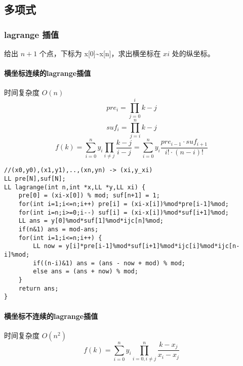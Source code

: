 \documentclass[UTF8]{ctexart}
\begin{document}
\subsection{多项式}
\subsubsection{lagrange 插值}
给出 $n+1$ 个点，下标为 x[0]\~{}x[n]，求出横坐标在 $xi$ 处的纵坐标。

\paragraph{横坐标连续的lagrange插值}
时间复杂度 $O(n)$
$$ pre_i=\prod_{j=0}^i k-j $$
$$ suf_i = \prod_{j=i}^n k-j $$
$$ f(k) = \sum_{i=0}^n y_i \prod_{i\not=j} \frac{k-j}{i-j} = \sum_{i=0}^n y_i \frac{pre_{i-1}\cdot suf_{i+1}}{i! \cdot (n-i)!}$$

\begin{framed}
\begin{lstlisting}
//(x0,y0),(x1,y1),..,(xn,yn) -> (xi,y_xi)
LL pre[N],suf[N];
LL lagrange(int n,int *x,LL *y,LL xi) {
    pre[0] = (xi-x[0]) % mod; suf[n+1] = 1;
    for(int i=1;i<=n;i++) pre[i] = (xi-x[i])%mod*pre[i-1]%mod;
    for(int i=n;i>=0;i--) suf[i] = (xi-x[i])%mod*suf[i+1]%mod;
    LL ans = y[0]%mod*suf[1]%mod*ijc[n]%mod;
    if(n&1) ans = mod-ans; 
    for(int i=1;i<=n;i++) {
        LL now = y[i]*pre[i-1]%mod*suf[i+1]%mod*ijc[i]%mod*ijc[n-i]%mod;
        if((n-i)&1) ans = (ans - now + mod) % mod;
        else ans = (ans + now) % mod;
    }
    return ans;
}
\end{lstlisting}
\end{framed}

\paragraph{横坐标不连续的lagrange插值}
时间复杂度 $O(n^2)$
$$ f(k) = \sum_{i=0}^n y_i \prod_{i=0,i\not=j}^n \frac{k-x_j}{x_i-x_j} $$
\end{document}
